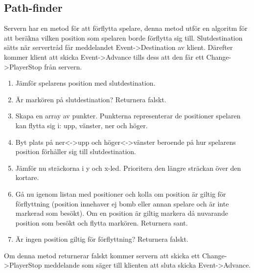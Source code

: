 \documentclass[10pt, titlepage, oneside, a4paper]{article}
\begin{document}
    	\newpage
    	\subsection{Path-finder}
    	Servern har en metod för att förflytta spelare, denna metod utför en algoritm för att beräkna vilken position som spelaren borde förflytta sig till. Slutdestination sätts när servertråd får meddelandet Event->Destination av klient. Därefter kommer klient att skicka Event->Advance tills dess att den får ett Change->PlayerStop från servern.
    	
    		\begin{enumerate}
    			\item Jämför spelarens position med slutdestination. 
    			\item Är markören på slutdestination? Returnera falskt.
    			\item Skapa en array av punkter. Punkterna representerar de positioner spelaren kan flytta sig i: upp, vänster, ner och höger.
    			\item Byt plats på ner<->upp och höger<->vänster beroende på hur spelarens position förhåller sig till slutdestination.
    			\item Jämför nu sträckorna i y och x-led. Prioritera den längre sträckan över den kortare. 
    			\item Gå nu igenom listan med positioner och kolla om position är giltig för förflyttning (position innehaver ej bomb eller annan spelare och är inte markerad som besökt). Om en position är giltig markera då nuvarande position som besökt och flytta markören. Returnera sant.
    			\item Är ingen position giltig för förflyttning? Returnera falskt.
    			 
    		\end{enumerate}
    	Om denna metod returnerar falskt kommer servern att skicka ett Change->PlayerStop meddelande som säger till klienten att sluta skicka Event->Advance.
    	
    	\newpage
\end{document}
